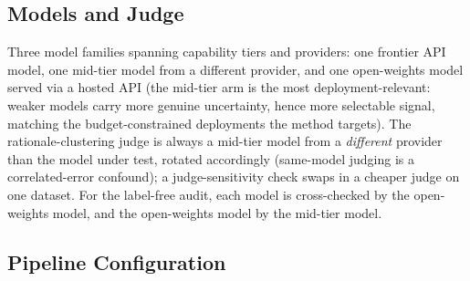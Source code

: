 \documentclass[11pt]{article}
\begin{document}
\subsection{Models and Judge}
\label{sec:exp:models}

Three model families spanning capability tiers and providers: one
frontier API model, one mid-tier model from a different provider, and
one open-weights model served via a hosted API (the mid-tier arm is
the most deployment-relevant: weaker models carry more genuine
uncertainty, hence more selectable signal, matching the
budget-constrained deployments the method targets). The
rationale-clustering judge is always a mid-tier model from a
\emph{different} provider than the model under test, rotated
accordingly (same-model judging is a correlated-error confound); a
judge-sensitivity check swaps in a cheaper judge on one dataset. For
the label-free audit, each model is cross-checked by the open-weights
model, and the open-weights model by the mid-tier model.

\subsection{Pipeline Configuration}
\label{sec:exp:pipeline}
\end{document}

